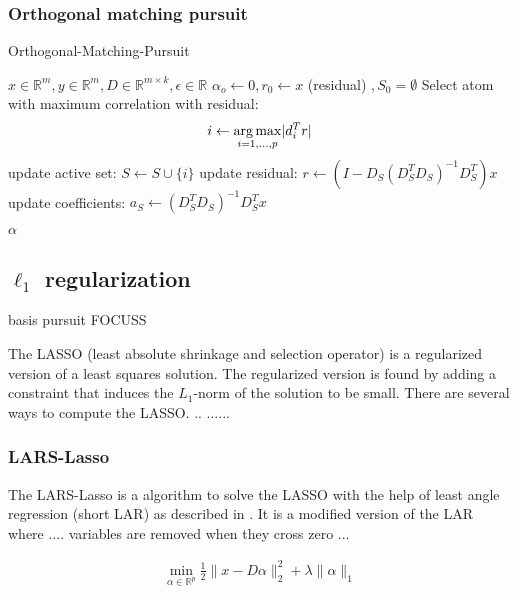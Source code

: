 \subsubsection{Orthogonal matching pursuit}
\cite{Pati1993}
\label{sec:omp}


\begin{algorithm}
\caption{Orthogonal-Matching-Pursuit}
\begin{algorithmic}[1]
\REQUIRE $x \in \mathbb{R}^m, y \in \mathbb{R}^m, D \in \mathbb{R}^{m\times k}, \epsilon \in \mathbb{R}$
\STATE $\alpha_o \gets 0, r_0 \gets x $ (residual) $, S_0=\emptyset$
\STATE Select atom with maximum correlation with residual: 
\begin{equation*}
i \gets \operatorname*{arg\,max}_{i=1,...,p} \lvert d_i^Tr \rvert
\end{equation*}
\STATE update active set: $S \gets S \cup \{i\} $
\STATE update residual: $r \gets \left(I-D_S\left( D_S^T D_S \right)^{-1} D_S^T \right)x$
\STATE update coefficients: $a_S \gets \left( D_S^T D_S \right)^{-1} D_S^T x $

\ENDFOR
\RETURN $\alpha$
\end{algorithmic}
\end{algorithm}

\subsection {$\ell_1$ regularization}

basis pursuit\cite{} 
FOCUSS \cite{}

The LASSO (least absolute shrinkage and selection operator) is a regularized version of a least squares solution.
The regularized version is found by adding a constraint that induces the $L_1$-norm of the solution to be small. \cite{Tibshirani1998}
There are several ways to compute the LASSO. .. ...... \cite{} 

\subsubsection {LARS-Lasso}
\label{sec:lars}
The LARS-Lasso is a algorithm to solve the LASSO with the help of least angle regression (short LAR)
as described in \cite{Efron2004}. It is a modified version of the LAR where .... variables are removed when they cross zero ...


\begin{align}
\min_{\alpha\in\mathbb{R}^{p}}  \frac{1}{2} \lVert x - D\alpha \rVert^{2}_{2} + \lambda \lVert \alpha \rVert_{1}
\end{align}

